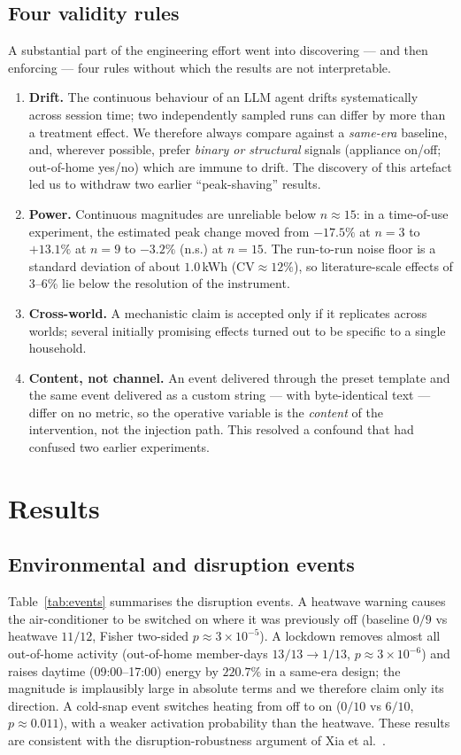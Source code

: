 \documentclass[11pt]{article}
\begin{document}
\subsection{Four validity rules}
A substantial part of the engineering effort went into discovering --- and then enforcing --- four rules
without which the results are not interpretable.
\begin{enumerate}
\item \textbf{Drift.} The continuous behaviour of an LLM agent drifts systematically across session time;
two independently sampled runs can differ by more than a treatment effect. We therefore always compare
against a \emph{same-era} baseline, and, wherever possible, prefer \emph{binary or structural} signals
(appliance on/off; out-of-home yes/no) which are immune to drift. The discovery of this artefact led us to
withdraw two earlier ``peak-shaving'' results.
\item \textbf{Power.} Continuous magnitudes are unreliable below $n\approx15$: in a time-of-use
experiment, the estimated peak change moved from $-17.5\%$ at $n=3$ to $+13.1\%$ at $n=9$ to $-3.2\%$
(n.s.) at $n=15$. The run-to-run noise floor is a standard deviation of about $1.0$\,kWh
($\mathrm{CV}\approx12\%$), so literature-scale effects of 3--6\% lie below the resolution of the
instrument.
\item \textbf{Cross-world.} A mechanistic claim is accepted only if it replicates across worlds; several
initially promising effects turned out to be specific to a single household.
\item \textbf{Content, not channel.} An event delivered through the preset template and the same event
delivered as a custom string --- with byte-identical text --- differ on no metric, so the operative
variable is the \emph{content} of the intervention, not the injection path. This resolved a confound that
had confused two earlier experiments.
\end{enumerate}

\section{Results}
\label{sec:results}

\subsection{Environmental and disruption events}
Table~\ref{tab:events} summarises the disruption events. A heatwave warning causes the air-conditioner to
be switched on where it was previously off (baseline $0/9$ vs heatwave $11/12$, Fisher two-sided
$p\approx3\times10^{-5}$). A lockdown removes almost all out-of-home activity (out-of-home member-days
$13/13\rightarrow1/13$, $p\approx3\times10^{-6}$) and raises daytime (09:00--17:00) energy by $220.7\%$ in
a same-era design; the magnitude is implausibly large in absolute terms and we therefore claim only its
direction. A cold-snap event switches heating from off to on ($0/10$ vs $6/10$, $p\approx0.011$), with a
weaker activation probability than the heatwave. These results are consistent with the disruption-robustness
argument of Xia et al.\ \cite{xia2026}.
\end{document}
